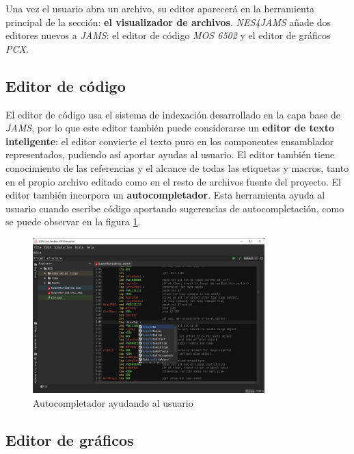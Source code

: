 Una vez el usuario abra un archivo, su editor aparecerá en la herramienta
principal de la sección: \textbf{el visualizador de archivos}.
\textit{NES4JAMS} añade dos editores nuevos a \textit{JAMS}:
el editor de código \textit{MOS 6502} y el editor de gráficos \textit{PCX}.

\subsection{Editor de código}\label{subsec:editor-de-codigo}

El editor de código usa el sistema de indexación desarrollado
en la capa base de \textit{JAMS}, por lo que este editor también
puede considerarse un \textbf{editor de texto inteligente}:
el editor convierte el texto puro en los componentes ensamblador
representados, pudiendo así aportar ayudas al usuario.
El editor también tiene conocimiento de las referencias y el alcance de
todas las etiquetas y macros, tanto en el propio archivo editado
como en el resto de archivos fuente del proyecto.
El editor también incorpora un \textbf{autocompletador}.
Esta herramienta ayuda al usuario cuando escribe código
aportando sugerencias de autocompletación, como se puede
observar en la figura \ref{fig:nes-autocompletion}.

\begin{figure}[h]
    \centering
    \includegraphics[width=0.8\textwidth]{images/nes/nes-autocompletion}
    \caption{Autocompletador ayudando al usuario}
    \label{fig:nes-autocompletion}
\end{figure}

\subsection{Editor de gráficos}\label{subsec:editor-de-graficos}

